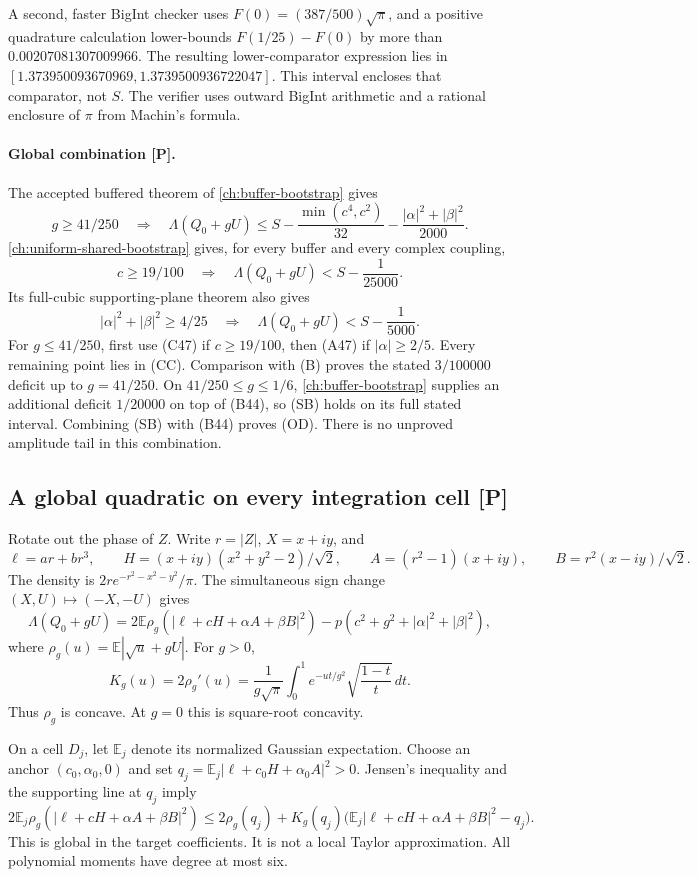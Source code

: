 A second, faster BigInt checker uses
$F(0)=(387/500)\sqrt\pi$, and a positive quadrature calculation
lower-bounds $F(1/25)-F(0)$ by more than $0.00207081307009966$.
The resulting lower-comparator expression lies in
$[1.373950093670969,1.3739500936722047]$. This interval encloses
that comparator, not $S$. The verifier uses outward BigInt arithmetic
and a rational enclosure of $\pi$ from Machin's formula.

\paragraph{Global combination [P].}
The accepted buffered theorem of \autoref{ch:buffer-bootstrap} gives
\[
 g\ge41/250\quad\Longrightarrow\quad
 \Lambda(Q_0+gU)\le S-\frac{\min(c^4,c^2)}{32}
                   -\frac{|\alpha|^2+|\beta|^2}{2000}.
 \tag{B44}
\]
\autoref{ch:uniform-shared-bootstrap} gives, for every buffer and every complex coupling,
\[
 c\ge19/100\quad\Longrightarrow\quad
 \Lambda(Q_0+gU)<S-\frac1{25000}.
 \tag{C47}
\]
Its full-cubic supporting-plane theorem also gives
\[
 |\alpha|^2+|\beta|^2\ge4/25
 \quad\Longrightarrow\quad
 \Lambda(Q_0+gU)<S-\frac1{5000}.
 \tag{A47}
\]
For $g\le41/250$, first use (C47) if $c\ge19/100$,
then (A47) if $|\alpha|\ge2/5$. Every remaining point lies in
(CC). Comparison with (B) proves the stated $3/100000$ deficit
up to $g=41/250$. On $41/250\le g\le1/6$, \autoref{ch:buffer-bootstrap} supplies
an additional deficit $1/20000$ on top of (B44), so (SB) holds
on its full stated interval.
Combining (SB) with (B44) proves (OD).
There is no unproved amplitude tail in this combination.

\subsection{A global quadratic on every integration cell [P]}
Rotate out the phase of $Z$. Write $r=|Z|$, $X=x+iy$, and
\[
 \ell=ar+br^3,\qquad
 H=(x+iy)(x^2+y^2-2)/\sqrt2,\qquad
 A=(r^2-1)(x+iy),\qquad B=r^2(x-iy)/\sqrt2.
\]
The density is $2r e^{-r^2-x^2-y^2}/\pi$.
The simultaneous sign change $(X,U)\mapsto(-X,-U)$ gives
\[
 \Lambda(Q_0+gU)
 =2\mathbb E\rho_g(|\ell+cH+\alpha A+\beta B|^2)
       -p(c^2+g^2+|\alpha|^2+|\beta|^2),
\]
where $\rho_g(u)=\mathbb E|\sqrt u+gU|$.
For $g>0$,
\[
 K_g(u)=2\rho_g'(u)
 =\frac1{g\sqrt\pi}\int_0^1 e^{-ut/g^2}
                         \sqrt{\frac{1-t}{t}}\,dt .
\]
Thus $\rho_g$ is concave. At $g=0$ this is square-root concavity.

On a cell $D_j$, let $\mathbb E_j$ denote its normalized Gaussian
expectation. Choose an anchor $(c_0,\alpha_0,0)$ and set
$q_j=\mathbb E_j|\ell+c_0H+\alpha_0A|^2>0$.
Jensen's inequality and the supporting line at $q_j$ imply
\[
 2\mathbb E_j\rho_g(|\ell+cH+\alpha A+\beta B|^2)
 \le2\rho_g(q_j)+K_g(q_j)
 \bigl(\mathbb E_j|\ell+cH+\alpha A+\beta B|^2-q_j\bigr).
 \tag{T}
\]
This is global in the target coefficients. It is not a local
Taylor approximation. All polynomial moments have degree at most six.

